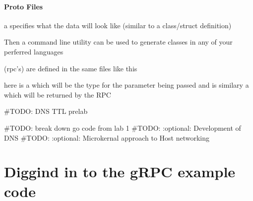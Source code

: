 \documentclass[letterpaper,10pt,english]{sphinxmanual}
\begin{document}
\subsubsection{Proto Files}
\label{\detokenize{week2:proto-files}}
a  specifies what the data will look like
(similar to a class/struct definition)

\begin{sphinxVerbatim}[commandchars=\\\{\},numbers=left,firstnumber=1,stepnumber=1]
  
           
           
           
\end{sphinxVerbatim}

Then a command line utility  can be used to generate classes
in any of your perferred languages

 (rpc’s) are defined in the same  files like this

\begin{sphinxVerbatim}[commandchars=\\\{\},numbers=left,firstnumber=1,stepnumber=1]
  
             
\end{sphinxVerbatim}

here  is a  which will be the type for the
parameter being passed and  is similary a 
which will be returned by the RPC

\#TODO: DNS TTL prelab

\#TODO: break down go code from lab 1
\#TODO: :optional: Development of DNS
\#TODO: :optional: Microkernal approach to Host networking


\chapter{Diggind in to the gRPC example code}
\label{\detokenize{grpc/grpc:diggind-in-to-the-grpc-example-code}}\label{\detokenize{grpc/grpc::doc}}
\end{document}
